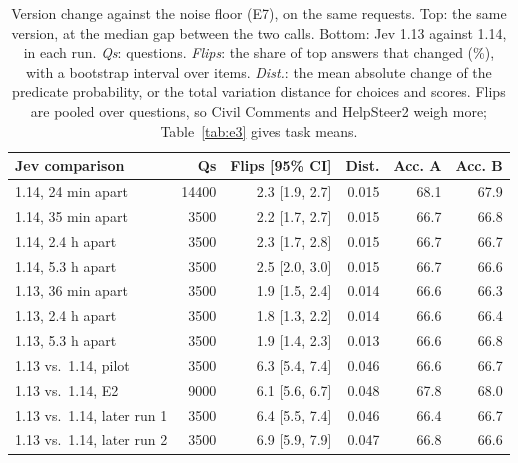 \begin{table}[t]
\centering
\scriptsize
\setlength{\tabcolsep}{2pt}
\begin{tabular}{@{}lrrrrr@{}}
\toprule
Jev comparison & Qs & Flips [95\% CI] & Dist. & Acc. A & Acc. B \\
\midrule
1.14, 24 min apart & 14400 & 2.3 [1.9, 2.7] & 0.015 & 68.1 & 67.9 \\
1.14, 35 min apart & 3500 & 2.2 [1.7, 2.7] & 0.015 & 66.7 & 66.8 \\
1.14, 2.4 h apart & 3500 & 2.3 [1.7, 2.8] & 0.015 & 66.7 & 66.7 \\
1.14, 5.3 h apart & 3500 & 2.5 [2.0, 3.0] & 0.015 & 66.7 & 66.6 \\
1.13, 36 min apart & 3500 & 1.9 [1.5, 2.4] & 0.014 & 66.6 & 66.3 \\
1.13, 2.4 h apart & 3500 & 1.8 [1.3, 2.2] & 0.014 & 66.6 & 66.4 \\
1.13, 5.3 h apart & 3500 & 1.9 [1.4, 2.3] & 0.013 & 66.6 & 66.8 \\
\midrule
1.13 vs.\ 1.14, pilot & 3500 & 6.3 [5.4, 7.4] & 0.046 & 66.6 & 66.7 \\
1.13 vs.\ 1.14, E2 & 9000 & 6.1 [5.6, 6.7] & 0.048 & 67.8 & 68.0 \\
1.13 vs.\ 1.14, later run 1 & 3500 & 6.4 [5.5, 7.4] & 0.046 & 66.4 & 66.7 \\
1.13 vs.\ 1.14, later run 2 & 3500 & 6.9 [5.9, 7.9] & 0.047 & 66.8 & 66.6 \\
\bottomrule
\end{tabular}
\caption{Version change against the noise floor (E7), on the same requests. Top: the same version, at the median gap between the two calls. Bottom: Jev 1.13 against 1.14, in each run. \emph{Qs}: questions. \emph{Flips}: the share of top answers that changed (\%), with a bootstrap interval over items. \emph{Dist.}: the mean absolute change of the predicate probability, or the total variation distance for choices and scores. Flips are pooled over questions, so Civil Comments and HelpSteer2 weigh more; Table~\ref{tab:e3} gives task means.}
\label{tab:e7}
\end{table}
